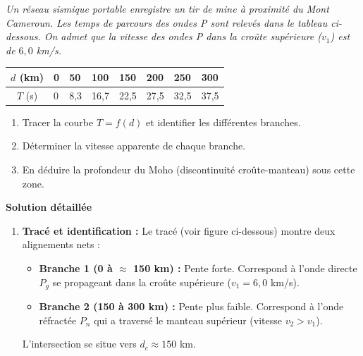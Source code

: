\documentclass[11pt]{article}
\begin{document}
\begin{exoresolu}
\emph{Un réseau sismique portable enregistre un tir de mine à proximité du Mont Cameroun. Les temps de parcours des ondes P sont relevés dans le tableau ci-dessous. On admet que la vitesse des ondes P dans la croûte supérieure ($v_1$) est de $6,0$ km/s.}
\begin{center}
\begin{tabularx}{\linewidth}{|c|*{7}{X|}}\hline
$d$ (km) & 0 & 50 & 100 & 150 & 200 & 250 & 300 \\ \hline
$T$ (s)  & 0 & 8,3 & 16,7 & 22,5 & 27,5 & 32,5 & 37,5 \\ \hline
\end{tabularx}
\end{center}
\begin{enumerate}
    \item Tracer la courbe $T = f(d)$ et identifier les différentes branches.
    \item Déterminer la vitesse apparente de chaque branche.
    \item En déduire la profondeur du Moho (discontinuité croûte-manteau) sous cette zone.
\end{enumerate}
\tcblower
\textbf{Solution détaillée}
\begin{enumerate}
    \item \textbf{Tracé et identification :}
    Le tracé (voir figure ci-dessous) montre deux alignements nets :
    \begin{itemize}
        \item \textbf{Branche 1 (0 à $\approx$ 150 km) :} Pente forte. Correspond à l'onde directe \textbf{$P_g$} se propageant dans la croûte supérieure ($v_1 = 6,0$ km/s).
        \item \textbf{Branche 2 (150 à 300 km) :} Pente plus faible. Correspond à l'onde réfractée \textbf{$P_n$} qui a traversé le manteau supérieur (vitesse $v_2 > v_1$).
    \end{itemize}
    L'intersection se situe vers $d_c \approx 150$ km.


\end{enumerate}
\end{exoresolu}
\end{document}
